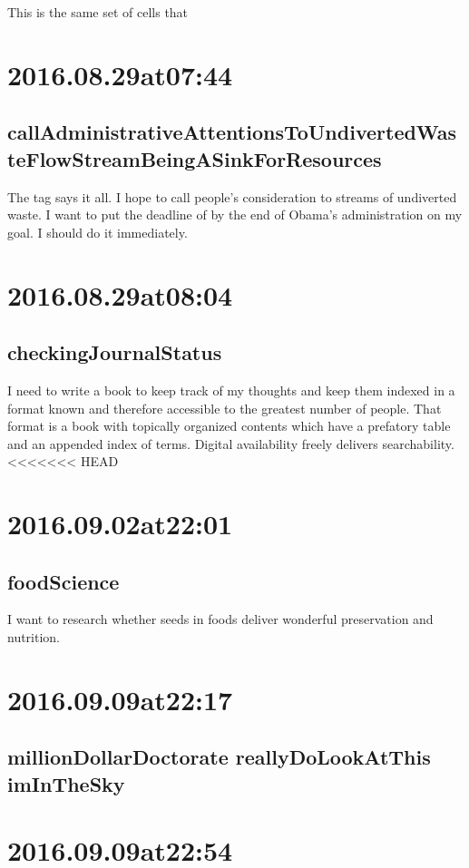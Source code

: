 This is the same set of cells that 

\section*{ 2016.08.29at07:44 }
\subsection*{callAdministrativeAttentionsToUndivertedWasteFlowStreamBeingASinkForResources}
The tag says it all. I hope to call people's consideration to streams of undiverted waste. I want to put the deadline of by the end of Obama's administration on my goal. I should do it immediately.

\section*{ 2016.08.29at08:04 }
\subsection*{checkingJournalStatus}
I need to write a book to keep track of my thoughts and keep them indexed in a format known and therefore accessible to the greatest number of people. That format is a book with topically organized contents which have a prefatory table and an appended index of terms. Digital availability freely delivers searchability.
<<<<<<< HEAD

\section*{ 2016.09.02at22:01 }
\subsection*{ foodScience }
I want to research whether seeds in foods deliver wonderful preservation and nutrition.

\section*{ 2016.09.09at22:17 }
\subsection*{ millionDollarDoctorate reallyDoLookAtThis imInTheSky }


\section*{ 2016.09.09at22:54 }
